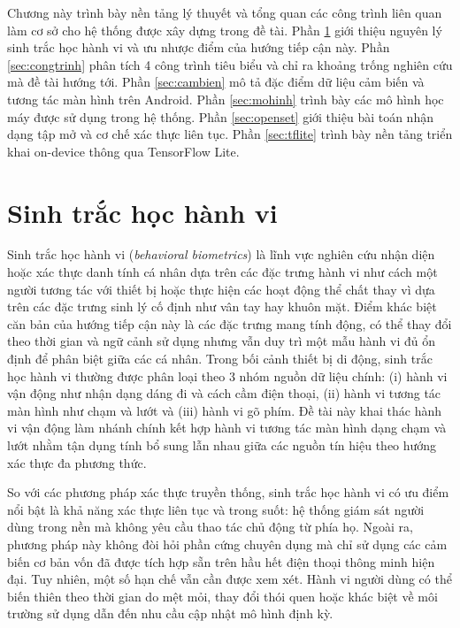 \documentclass[../DoAn.tex]{subfiles}
\begin{document}
Chương này trình bày nền tảng lý thuyết và tổng quan các công trình liên quan làm cơ sở cho hệ thống được xây dựng trong đề tài. Phần \ref{sec:bbthoai} giới thiệu nguyên lý sinh trắc học hành vi và ưu nhược điểm của hướng tiếp cận này. Phần \ref{sec:congtrinh} phân tích 4 công trình tiêu biểu và chỉ ra khoảng trống nghiên cứu mà đề tài hướng tới. Phần \ref{sec:cambien} mô tả đặc điểm dữ liệu cảm biến và tương tác màn hình trên Android. Phần \ref{sec:mohinh} trình bày các mô hình học máy được sử dụng trong hệ thống. Phần \ref{sec:openset} giới thiệu bài toán nhận dạng tập mở và cơ chế xác thực liên tục. Phần \ref{sec:tflite} trình bày nền tảng triển khai on-device thông qua TensorFlow Lite.

\section{Sinh trắc học hành vi}
\label{sec:bbthoai}

Sinh trắc học hành vi (\textit{behavioral biometrics}) là lĩnh vực nghiên cứu nhận diện hoặc xác thực danh tính cá nhân dựa trên các đặc trưng hành vi như cách một người tương tác với thiết bị hoặc thực hiện các hoạt động thể chất thay vì dựa trên các đặc trưng sinh lý cố định như vân tay hay khuôn mặt. Điểm khác biệt căn bản của hướng tiếp cận này là các đặc trưng mang tính động, có thể thay đổi theo thời gian và ngữ cảnh sử dụng nhưng vẫn duy trì một mẫu hành vi đủ ổn định để phân biệt giữa các cá nhân. Trong bối cảnh thiết bị di động, sinh trắc học hành vi thường được phân loại theo 3 nhóm nguồn dữ liệu chính: (i) hành vi vận động như nhận dạng dáng đi và cách cầm điện thoại, (ii) hành vi tương tác màn hình như chạm và lướt và (iii) hành vi gõ phím. Đề tài này khai thác hành vi vận động làm nhánh chính kết hợp hành vi tương tác màn hình dạng chạm và lướt nhằm tận dụng tính bổ sung lẫn nhau giữa các nguồn tín hiệu theo hướng xác thực đa phương thức.

So với các phương pháp xác thực truyền thống, sinh trắc học hành vi có ưu điểm nổi bật là khả năng xác thực liên tục và trong suốt: hệ thống giám sát người dùng trong nền mà không yêu cầu thao tác chủ động từ phía họ. Ngoài ra, phương pháp này không đòi hỏi phần cứng chuyên dụng mà chỉ sử dụng các cảm biến cơ bản vốn đã được tích hợp sẵn trên hầu hết điện thoại thông minh hiện đại. Tuy nhiên, một số hạn chế vẫn cần được xem xét. Hành vi người dùng có thể biến thiên theo thời gian do mệt mỏi, thay đổi thói quen hoặc khác biệt về môi trường sử dụng dẫn đến nhu cầu cập nhật mô hình định kỳ.
\end{document}
